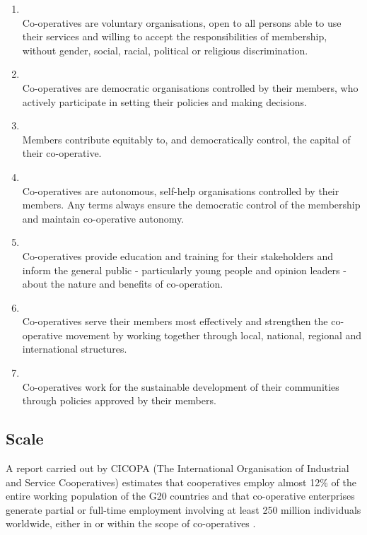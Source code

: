 \begin{enumerate}
\item {} \\ Co-operatives are voluntary organisations, open to all persons able to use their services and willing to accept the responsibilities of membership, without gender, social, racial, political or religious discrimination.

\item {} \\ Co-operatives are democratic organisations controlled by their members, who actively participate in setting their policies and making decisions. 

\item {} \\ Members contribute equitably to, and democratically control, the capital of their co-operative.

\item {} \\ Co-operatives are autonomous, self-help organisations controlled by their members. Any terms always ensure the democratic control of the membership and maintain co-operative autonomy.

\item {} \\ Co-operatives provide education and training for their stakeholders and inform the general public - particularly young people and opinion leaders - about the nature and benefits of co-operation.

\item {} \\ Co-operatives serve their members most effectively and strengthen the co-operative movement by working together through local, national, regional and international structures.

\item {} \\ Co-operatives work for the sustainable development of their communities through policies approved by their members.

\end{enumerate}

\subsection{Scale}
A report carried out by CICOPA (The International Organisation of Industrial and Service Cooperatives) estimates that cooperatives employ almost 12\% of the entire working population of the G20 countries and that co-operative enterprises generate partial or full-time employment involving at least 250 million individuals worldwide, either in or within the scope of co-operatives \cite{roelants2014cooperatives}.\\

